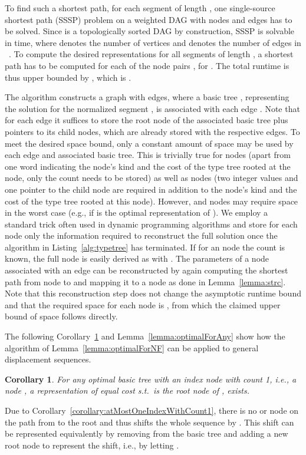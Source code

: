 \documentclass[a4paper,11pt]{article}
\newtheorem{corollary}{Corollary}
\newenvironment{proof}{\par\noindent{\textsc{Proof:}}\space}{\protect\\ \par}
\begin{document}
\begin{proof}
To find such a shortest path, for each segment  of
length , one single-source shortest path (SSSP) problem on a
weighted DAG with  nodes and  edges has to be solved.
Since  is a topologically sorted DAG by construction, SSSP is
solvable in  time, where  denotes the number of
vertices and  denotes the number of edges in
~\cite{CormenLeisersonRivestStein09}.  To compute the desired
representations for all segments of length , a shortest path has to
be computed for each of the  node pairs , for
.  The total runtime is thus upper bounded by
, which is .

The algorithm constructs a graph with  edges, where a basic
tree , representing the solution for the normalized segment
, is associated with each edge .  Note that
for each edge  it suffices to store the root node of the
associated basic tree  plus pointers to its child nodes,
which are already stored with the respective edges.  To meet the
desired space bound, only a constant amount of space may be used by
each edge and associated basic tree.  This is trivially true for
 nodes (apart from one word indicating the node's kind and the
cost of the type tree rooted at the node, only the count  needs to
be stored) as well as  nodes (two integer values and one pointer
to the child node are required in addition to the node's kind and the
cost of the type tree rooted at this node).  However,  and
 nodes may require  space in the worst case (e.g.,
if  is the optimal representation of
).  We employ a standard trick often used in dynamic
programming algorithms and store for each node only the information
required to reconstruct the full solution once the algorithm in
Listing~\ref{alg:typetree} has terminated.  If for an  node the
count  is known, the full  node is easily derived as  with
.  The parameters of a  node associated with an edge
 can be reconstructed by again computing the shortest path
from node  to  and mapping it to a  node as done in
Lemma~\ref{lemma:strc}.  Note that this reconstruction step does not
change the asymptotic runtime bound and that the required space for
each node is , from which the claimed upper bound of 
space follows directly.
\end{proof}

The following Corollary~\ref{corollary:idxWithCount1IsRoot} and
Lemma~\ref{lemma:optimalForAny} show how the algorithm of
Lemma~\ref{lemma:optimalForNF} can be applied to general displacement
sequences.
\begin{corollary}
\label{corollary:idxWithCount1IsRoot}
For any optimal basic tree with an index node  with count 1, i.e.,
a node , a representation  of equal
cost s.t.\  is the root node of , exists.
\end{corollary}
\begin{proof}
Due to Corollary~\ref{corollary:atMostOneIndexWithCount1}, there is no
 or  node on the path from  to the root and thus 
shifts the whole sequence by .  This shift can be represented
equivalently by removing  from the basic tree and adding a new root
node to represent the shift, i.e., by letting .
\end{proof}
\end{document}
